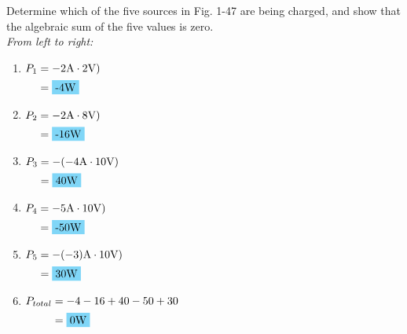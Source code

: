 Determine which of the five sources in Fig. 1-47 are being charged, and show that the algebraic sum of the five values is zero.\\[1cm]
\emph{From left to right:}
\begin{enumerate}[leftmargin=2cm,labelsep=.5cm,label=\bfseries\alph*)]
	\item $
	\begin{aligned}[t]
	P_1 &= -2\qw{\A}\cdot 2\qw{\V}) \\
	&= \hlbox{-4\qw{\W}} \\
	\end{aligned} $
	\\[1cm]
	
	\item $
	\begin{aligned}[t]
	P_2 &= -2\qw{\A}\cdot 8\qw{\V}) \\
	&= \hlbox{-16\qw{\W}} \\
	\end{aligned} $
	\\[1cm]
	
	\item $
	\begin{aligned}[t]
	P_3 &= -(-4\qw{\A}\cdot 10\qw{\V}) \\
	&= \hlbox{40\qw{\W}} \\
	\end{aligned} $
	\\[1cm]
	
	\item $
	\begin{aligned}[t]
	P_4 &= -5\qw{\A}\cdot 10\qw{\V}) \\
	&= \hlbox{-50\qw{\W}} \\
	\end{aligned} $
	\\[1cm]
	
	\item $
	\begin{aligned}[t]
	P_5 &= -(-3)\qw{\A}\cdot 10\qw{\V}) \\
	&= \hlbox{30\qw{\W}} \\
	\end{aligned} $
	\\[1cm]
	
	\item $
	\begin{aligned}[t]
	P_{total} &= -4-16+40-50+30 \\
	&= \hlbox{0\qw{\W}} \\
	\end{aligned} $ \\
	\\[1cm]
\end{enumerate}